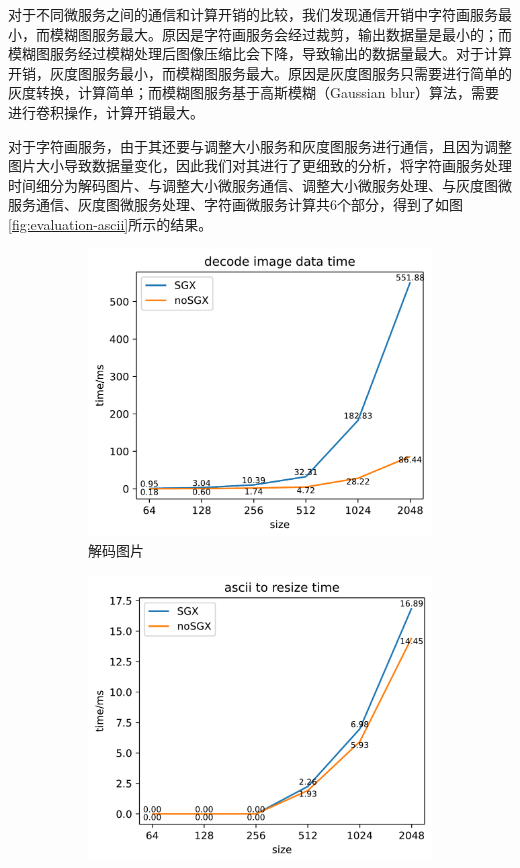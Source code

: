 对于不同微服务之间的通信和计算开销的比较，我们发现通信开销中字符画服务最小，而模糊图服务最大。原因是字符画服务会经过裁剪，输出数据量是最小的；而模糊图服务经过模糊处理后图像压缩比会下降，导致输出的数据量最大。对于计算开销，灰度图服务最小，而模糊图服务最大。原因是灰度图服务只需要进行简单的灰度转换，计算简单；而模糊图服务基于高斯模糊（Gaussian blur）算法，需要进行卷积操作，计算开销最大。

对于字符画服务，由于其还要与调整大小服务和灰度图服务进行通信，且因为调整图片大小导致数据量变化，因此我们对其进行了更细致的分析，将字符画服务处理时间细分为解码图片、与调整大小微服务通信、调整大小微服务处理、与灰度图微服务通信、灰度图微服务处理、字符画微服务计算共6个部分，得到了如图\ref{fig:evaluation-ascii}所示的结果。

\begin{figure}[!ht]
    \centering
    \begin{subfigure}{0.3\textwidth}
        \centering
        \includegraphics[width=\textwidth]{figures/decode_image.pdf}
        \caption{解码图片}
    \end{subfigure}
    \begin{subfigure}{0.3\textwidth}
        \centering
        \includegraphics[width=\textwidth]{figures/ascii_to_resize.pdf}

\end{subfigure}
\end{figure}
